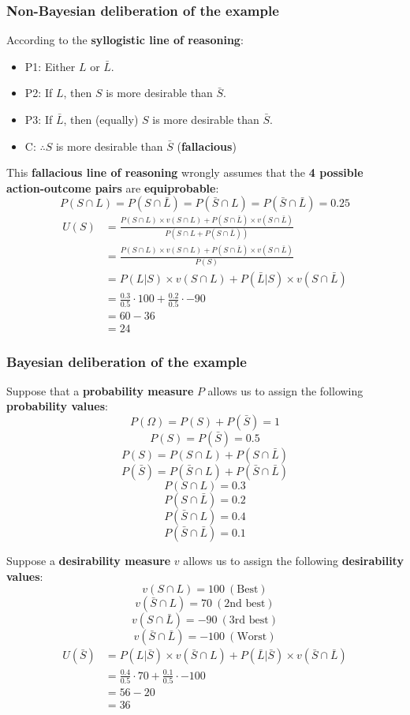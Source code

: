 \documentclass[11pt]{article}
\begin{document}
\subsubsection{Non-Bayesian deliberation of the example}
\label{sec:org8da8b3f}
According to the \textbf{syllogistic line of reasoning}:
\begin{itemize}
\item P1: Either \(L\) or \(\bar{L}\).
\item P2: If \(L\), then \(S\) is more desirable than \(\bar{S}\).
\item P3: If \(\bar{L}\), then (equally) \(S\) is more desirable than \(\bar{S}\).
\item C: \(\therefore S\) is more desirable than \(\bar{S}\) (\textbf{fallacious})
\end{itemize}

This \textbf{fallacious line of reasoning} wrongly assumes that the \textbf{4 possible action-outcome pairs} are \textbf{equiprobable}:
\[P(S \cap L) = P(S \cap \bar{L}) = P(\bar{S} \cap L) = P (\bar{S} \cap \bar{L}) = 0.25\]
\begin{align*}
U(S) &= \frac{P(S \cap L) \times v(S \cap L) + P(S \cap \bar{L}) \times v(S \cap \bar{L})}{P(S \cap L + P(S \cap \bar{L}))} \\
&= \frac{P(S \cap L) \times v(S \cap L) + P(S \cap \bar{L}) \times v(S \cap \bar{L})}{P(S)} \\
&= P(L | S) \times v (S \cap L) + P(\bar{L} | S) \times v(S \cap \bar{L}) \\
&= \frac{0.3}{0.5} \cdot 100 + \frac{0.2}{0.5} \cdot -90 \\
&= 60 - 36 \\
&= 24
\end{align*}

 \newpage
\subsubsection{Bayesian deliberation of the example}
\label{sec:org0eba49d}
Suppose that a \textbf{probability measure} \(P\) allows us to assign the following \textbf{probability values}:
\[P(\Omega) = P(S) + P(\bar{S}) = 1\]
\[P(S) = P(\bar{S}) = 0.5\]
\[P(S) = P(S \cap L) + P(S \cap \bar{L})\]
\[P(\bar{S}) = P(\bar{S} \cap L) + P(\bar{S} \cap \bar{L})\]
\[P(S \cap L) = 0.3\]
\[P(S \cap \bar{L}) = 0.2\]
\[P(\bar{S} \cap L) = 0.4\]
\[P(\bar{S} \cap \bar{L}) = 0.1\]

Suppose a \textbf{desirability measure} \(v\) allows us to assign the following \textbf{desirability values}:
\[v(S \cap L) = 100 \ (\text{Best})\]
\[v(\bar{S} \cap L) = 70 \ (\text{2nd best})\]
\[v(S \cap \bar{L}) = -90 \ (\text{3rd best})\]
\[v(\bar{S} \cap \bar{L}) = -100 \ (\text{Worst})\]
\begin{align*}
U(\bar{S}) &= P(L | \bar{S}) \times v(\bar{S} \cap L) + P (\bar{L} | \bar{S}) \times v(\bar{S} \cap \bar{L}) \\
&= \frac{0.4}{0.5} \cdot 70 + \frac{0.1}{0.5} \cdot -100 \\
&= 56 - 20 \\
&= 36
\end{align*}
\end{document}
